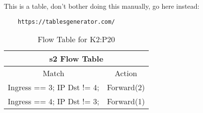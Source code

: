 \documentclass{article}
\begin{document}
This is a table, don't bother doing this manually, go here instead:
\begin{verbatim}
    https://tablesgenerator.com/
\end{verbatim}

\begin{table}[h!]
\centering
\caption{Flow Table for K2:P20}
\label{my-lererabel}
\begin{tabular}{|c|c|}
\hline
\multicolumn{2}{|c|}{s2 Flow Table}     \\ \hline
Match                      & Action     \\ \hline
Ingress == 3; IP Dst != 4; & Forward(2) \\ \hline
Ingress == 4; IP Dst != 3; & Forward(1) \\ \hline
\end{tabular}
\end{table}
\end{document}
